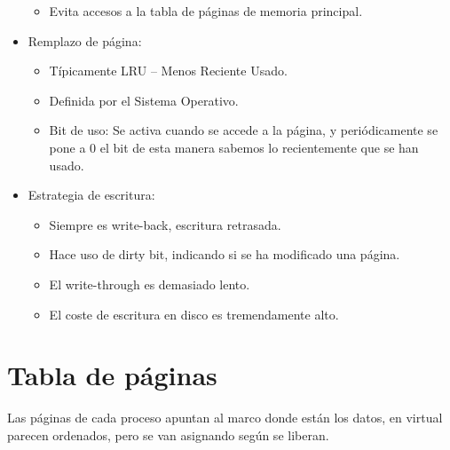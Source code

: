 \documentclass[12pt, twoside, openright]{report} %
\begin{document}
\begin{itemize}
    \begin{itemize}
    
    \item
      Evita accesos a la tabla de páginas de memoria principal.
    \end{itemize}
  \item
    Remplazo de página:

    \begin{itemize}
    
    \item
      Típicamente LRU -- Menos Reciente Usado.
    \item
      Definida por el Sistema Operativo.
    \item
      Bit de uso: Se activa cuando se accede a la página, y
      periódicamente se pone a 0 el bit de esta manera sabemos lo
      recientemente que se han usado.
    \end{itemize}
  \item
    Estrategia de escritura:

    \begin{itemize}
    
    \item
      Siempre es write-back, escritura retrasada.
    \item
      Hace uso de dirty bit, indicando si se ha modificado una página.
    \item
      El write-through es demasiado lento.
    \item
      El coste de escritura en disco es tremendamente alto.
    \end{itemize}
  \end{itemize}

  \section{Tabla de páginas}

  Las páginas de cada proceso apuntan al marco donde están los datos, en
  virtual parecen ordenados, pero se van asignando según se liberan.
\end{document}
